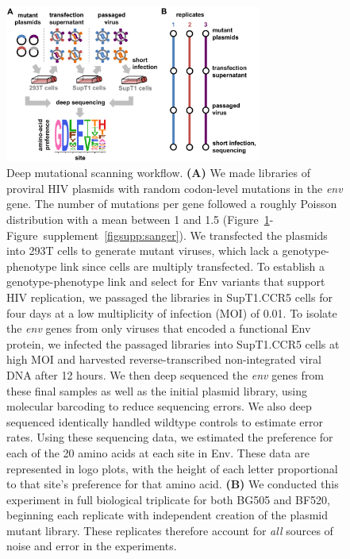 \documentclass[9pt]{elife}
\begin{document}
\begin{figure}
\centerline{\includegraphics[width=0.75\textwidth]{figures/dms_schematic/dms_schematic.pdf}}
\caption{\label{fig:dms_schematic}
Deep mutational scanning workflow.
{\bf (A)} We made libraries of proviral HIV plasmids with random codon-level mutations in the \textit{env} gene.
The number of mutations per gene followed a roughly Poisson distribution with a mean between 1 and 1.5 (Figure~\ref{fig:dms_schematic}-Figure~supplement~\ref{figsupp:sanger}).
We transfected the plasmids into 293T cells to generate mutant viruses, which lack a genotype-phenotype link since cells are multiply transfected.
To establish a genotype-phenotype link and select for Env variants that support HIV replication, we passaged the libraries in SupT1.CCR5 cells for four days at a low multiplicity of infection (MOI) of 0.01.
To isolate the \textit{env} genes from only viruses that encoded a functional Env protein, we infected the passaged libraries into SupT1.CCR5 cells at high MOI and harvested reverse-transcribed non-integrated viral DNA after 12 hours.
We then deep sequenced the \textit{env} genes from these final samples as well as the initial plasmid library, using molecular barcoding to reduce sequencing errors.
We also deep sequenced identically handled wildtype controls to estimate error rates.
Using these sequencing data, we estimated the preference for each of the 20 amino acids at each site in Env.
These data are represented in logo plots, with the height of each letter proportional to that site's preference for that amino acid.
{\bf (B)} We conducted this experiment in full biological triplicate for both BG505 and BF520, beginning each replicate with independent creation of the plasmid mutant library.
These replicates therefore account for \emph{all} sources of noise and error in the experiments.
}
\end{figure}
\end{document}
